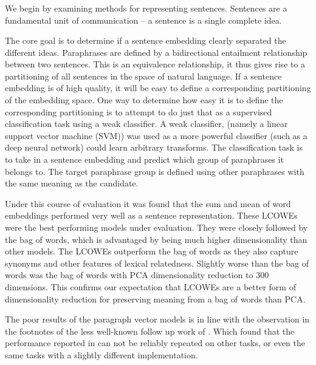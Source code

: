 \documentclass{book}
\begin{document}
\newcommand{\detailcite}[1]{\citetitle{#1} \citep{#1}}

\subsubsection{ \detailcite{White2015SentVecMeaning}}
We begin by examining methods for representing sentences.
Sentences are a fundamental unit of communication --
a sentence is a single complete idea.

The core goal is to determine if a sentence embedding clearly separated the different ideas.
Paraphrases are defined by a bidirectional entailment relationship between two sentences.
This is an equivalence relationship, it thus gives rise to a partitioning of all sentences in the space of natural language.
If a sentence embedding is of high quality, it will be easy to define a corresponding partitioning of the embedding space.
One way to determine how easy it is to define the corresponding partitioning is to attempt to do just that as a supervised classification task using a weak classifier.
A weak classifier, (namely a linear support vector machine (SVM)) was used as a more powerful classifier (such as a deep neural network) could learn arbitrary transforms.
The classification task is to take in a sentence embedding and predict which group of paraphrases it belongs to.
The target paraphrase group is defined using other paraphrases with the same meaning as the candidate.

Under this course of evaluation it was found that the sum and mean of word embeddings performed very well as a sentence representation.
These LCOWEs were the best performing models under evaluation.
They were closely followed by the bag of words, which is advantaged by being much higher dimensionality than other models.
The LCOWEs outperform the bag of words as they also capture  synonyms and other features of lexical relatedness.
Slightly worse than the bag of words was the bag of words with PCA dimensionality reduction to 300 dimensions.
This confirms our expectation that LCOWEs are a better form of dimensionality reduction for preserving meaning from a bag of words than PCA.


The poor results of the paragraph vector models \citep{le2014distributed} is in line with the observation in the footnotes of the less well-known follow up work of \citet{mesnil2014ensemble}.
Which found that the performance reported in \citet{le2014distributed} can not be reliably repeated on other tasks, or even the same tasks with a slightly different implementation.
 
\end{document}
